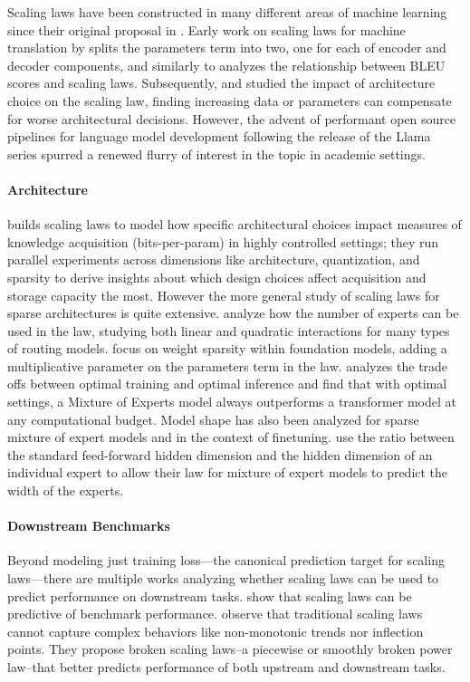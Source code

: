 \documentclass{article}
\begin{document}
Scaling laws have been constructed in many different areas of machine learning since their original proposal in \citep{kaplan2020scaling}. 
Early work on scaling laws for machine translation by \citet{ghorbani2021scaling} splits the parameters term into two, one for each of encoder and decoder components, and similarly to \citet{gordon2021data} analyzes the relationship between BLEU scores and scaling laws.
Subsequently, \citet{zhang2022examining} and \citet{bansal2022data} studied the impact of architecture choice on the scaling law, finding increasing data or parameters can compensate for worse architectural decisions.
However, the advent of performant open source pipelines for language model development following the release of the Llama series \citep{touvron2023llama1} spurred a renewed flurry of interest in the topic in academic settings.

\paragraph{Architecture}
\citet{allen2024physics} builds scaling laws to model how specific architectural choices impact measures of knowledge acquisition (bits-per-param) in highly controlled settings; they run parallel experiments across dimensions like architecture, quantization, and sparsity to derive insights about which design choices affect acquisition and storage capacity the most.
However the more general study of scaling laws for sparse architectures is quite extensive.
\citet{clark2022unified} analyze how the number of experts can be used in the law, studying both linear and quadratic interactions for many types of routing models.
\citet{frantar2023scaling} focus on weight sparsity within foundation models, adding a multiplicative parameter on the parameters term in the law.
\citet{yun2024toward} analyzes the trade offs between optimal training and optimal inference and \citet{krajewski2024scaling} find that with optimal settings, a Mixture of Experts model always outperforms a transformer model at any computational budget.
Model shape has also been analyzed for sparse mixture of expert models and in the context of finetuning.
\citet{krajewski2024scaling} use the ratio between the standard feed-forward hidden dimension and the hidden dimension of an individual expert to allow their law for mixture of expert models to predict the width of the experts. 

\paragraph{Downstream Benchmarks}
Beyond modeling just training loss---the canonical prediction target for scaling laws---there are multiple works analyzing whether scaling laws can be used to predict performance on downstream tasks.
\citet{observational} show that scaling laws can be predictive of benchmark performance.
\citet{caballero2023broken} observe that traditional scaling laws cannot capture complex behaviors like non-monotonic trends nor inflection points. They propose broken scaling laws--a piecewise or smoothly broken power law--that better predicts performance of both upstream and downstream tasks.
\end{document}
